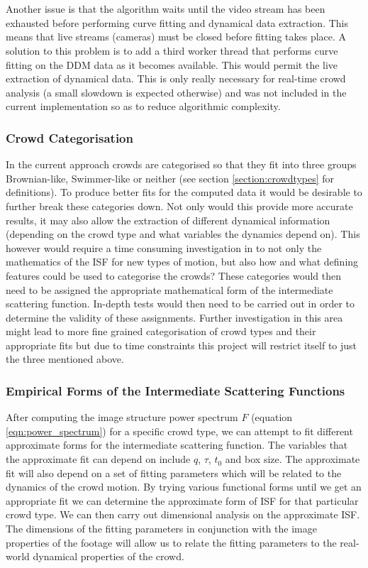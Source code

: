 \documentclass[10pt]{article}
\begin{document}
\\\\
Another issue is that the algorithm waits until the video stream has been exhausted before performing curve fitting and dynamical data extraction. This means that live streams (cameras) must be closed before fitting takes place. A solution to this problem is to add a third worker thread that performs curve fitting on the DDM data as it becomes available. This would permit the live extraction of dynamical data. This is only really necessary for real-time crowd analysis (a small slowdown is expected otherwise) and was not included in the current implementation so as to reduce algorithmic complexity.
\subsubsection{Crowd Categorisation}
In the current approach crowds are categorised so that they fit into three groups Brownian-like, Swimmer-like or neither (see section \ref{section:crowdtypes} for definitions). To produce better fits for the computed data it would be desirable to further break these categories down. Not only would this provide more accurate results, it may also allow the extraction of different dynamical information (depending on the crowd type and what variables the dynamics depend on). This however would require a time consuming investigation in to not only the mathematics of the ISF for new types of motion, but also how and what defining features could be used to categorise the crowds? These categories would then need to be assigned the appropriate mathematical form of the intermediate scattering function. In-depth tests would then need to be carried out in order to determine the validity of these assignments. Further investigation in this area might lead to more fine grained categorisation of crowd types and their appropriate fits but due to time constraints this project will restrict itself to just the three mentioned above.

\subsubsection{Empirical Forms of the Intermediate Scattering Functions}
After computing the image structure power spectrum $F$ (equation \ref{eqn:power_spectrum}) for a specific crowd type, we can attempt to fit different approximate forms for the intermediate scattering function. The variables that the approximate fit can depend on include $q$, $\tau$, $t_0$ and box size. The approximate fit will also depend on a set of fitting parameters which will be related to the dynamics of the crowd motion. By trying various functional forms until we get an appropriate fit we can determine the approximate form of ISF for that particular crowd type. We can then carry out dimensional analysis on the approximate ISF. The dimensions of the fitting parameters in conjunction with the image properties of the footage will allow us to relate the fitting parameters to the real-world dynamical properties of the crowd.
\end{document}
